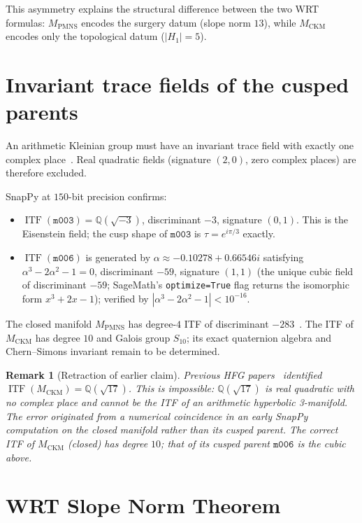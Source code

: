 \documentclass[11pt,a4paper]{article}
\newtheorem{remark}[theorem]{Remark}
\theoremstyle{definition}
\newcommand{\Q}{\mathbb{Q}}
\newcommand{\mfld}[1]{\texttt{#1}}
\newcommand{\ITF}{\operatorname{ITF}}
\begin{document}
This asymmetry explains the structural difference between the two WRT
formulas: $M_{\mathrm{PMNS}}$ encodes the surgery datum (slope norm $13$),
while $M_{\mathrm{CKM}}$ encodes only the topological datum ($|H_1|=5$).

\section{Invariant trace fields of the cusped parents}
\label{sec:ITF}

An arithmetic Kleinian group must have an invariant trace field with
exactly one complex place~\cite{MaclachlanReid}.
Real quadratic fields (signature $(2,0)$, zero complex places) are
therefore excluded.

SnapPy at $150$-bit precision confirms:
\begin{itemize}
\item $\ITF(\mfld{m003}) = \Q(\sqrt{-3})$, discriminant $-3$,
  signature $(0,1)$. This is the Eisenstein field; the cusp shape
  of $\mfld{m003}$ is $\tau=e^{i\pi/3}$ exactly.
\item $\ITF(\mfld{m006})$ is generated by
  $\alpha\approx-0.10278+0.66546i$ satisfying
  $\alpha^3-2\alpha^2-1=0$, discriminant $-59$, signature $(1,1)$
  (the unique cubic field of discriminant $-59$; SageMath's
  \texttt{optimize=True} flag returns the isomorphic form $x^3+2x-1$);
  verified by $|\alpha^3-2\alpha^2-1|<10^{-16}$.
\end{itemize}

The closed manifold $M_{\mathrm{PMNS}}$ has degree-$4$ ITF of
discriminant $-283$~\cite{Chinburg01}. The ITF of $M_{\mathrm{CKM}}$
has degree $10$ and Galois group $S_{10}$; its exact quaternion algebra
and Chern--Simons invariant remain to be determined.

\begin{remark}[Retraction of earlier claim]
\label{rem:correction}
Previous HFG papers~\cite{GentryBridge} identified
$\ITF(M_{\mathrm{CKM}})=\Q(\sqrt{17})$.
This is impossible: $\Q(\sqrt{17})$ is real quadratic with no complex
place and cannot be the ITF of an arithmetic hyperbolic 3-manifold.
The error originated from a numerical coincidence in an early SnapPy
computation on the closed manifold rather than its cusped parent.
The correct ITF of $M_{\mathrm{CKM}}$ (closed) has degree $10$;
that of its cusped parent $\mfld{m006}$ is the cubic above.
\end{remark}

\section{WRT Slope Norm Theorem}
\label{sec:wrt}
\end{document}
